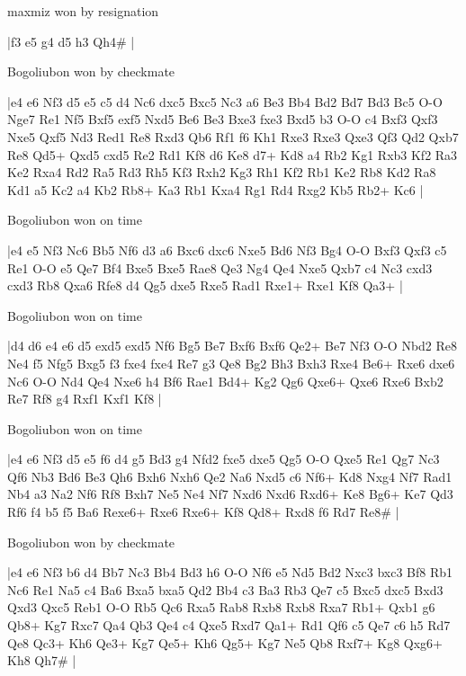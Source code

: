 \showboard

maxmiz won by resignation

\makegametitle
|f3 e5 g4 d5 h3 Qh4\#  |

\showboard

Bogoliubon won by checkmate

\makegametitle
|e4 e6 Nf3 d5 e5 c5 d4 Nc6 dxc5 Bxc5 Nc3 a6 Be3 Bb4 Bd2 Bd7 Bd3 Bc5 O-O Nge7 Re1 Nf5 Bxf5 exf5 Nxd5 Be6 Be3 Bxe3 fxe3 Bxd5 b3 O-O c4 Bxf3 Qxf3 Nxe5 Qxf5 Nd3 Red1 Re8 Rxd3 Qb6 Rf1 f6 Kh1 Rxe3 Rxe3 Qxe3 Qf3 Qd2 Qxb7 Re8 Qd5+ Qxd5 cxd5 Re2 Rd1 Kf8 d6 Ke8 d7+ Kd8 a4 Rb2 Kg1 Rxb3 Kf2 Ra3 Ke2 Rxa4 Rd2 Ra5 Rd3 Rh5 Kf3 Rxh2 Kg3 Rh1 Kf2 Rb1 Ke2 Rb8 Kd2 Ra8 Kd1 a5 Kc2 a4 Kb2 Rb8+ Ka3 Rb1 Kxa4 Rg1 Rd4 Rxg2 Kb5 Rb2+ Kc6  |

\showboard

Bogoliubon won on time

\makegametitle
|e4 e5 Nf3 Nc6 Bb5 Nf6 d3 a6 Bxc6 dxc6 Nxe5 Bd6 Nf3 Bg4 O-O Bxf3 Qxf3 c5 Re1 O-O e5 Qe7 Bf4 Bxe5 Bxe5 Rae8 Qe3 Ng4 Qe4 Nxe5 Qxb7 c4 Nc3 cxd3 cxd3 Rb8 Qxa6 Rfe8 d4 Qg5 dxe5 Rxe5 Rad1 Rxe1+ Rxe1 Kf8 Qa3+  |

\showboard

Bogoliubon won on time

\makegametitle
|d4 d6 e4 e6 d5 exd5 exd5 Nf6 Bg5 Be7 Bxf6 Bxf6 Qe2+ Be7 Nf3 O-O Nbd2 Re8 Ne4 f5 Nfg5 Bxg5 f3 fxe4 fxe4 Re7 g3 Qe8 Bg2 Bh3 Bxh3 Rxe4 Be6+ Rxe6 dxe6 Nc6 O-O Nd4 Qe4 Nxe6 h4 Bf6 Rae1 Bd4+ Kg2 Qg6 Qxe6+ Qxe6 Rxe6 Bxb2 Re7 Rf8 g4 Rxf1 Kxf1 Kf8  |

\showboard

Bogoliubon won on time

\makegametitle
|e4 e6 Nf3 d5 e5 f6 d4 g5 Bd3 g4 Nfd2 fxe5 dxe5 Qg5 O-O Qxe5 Re1 Qg7 Nc3 Qf6 Nb3 Bd6 Be3 Qh6 Bxh6 Nxh6 Qe2 Na6 Nxd5 c6 Nf6+ Kd8 Nxg4 Nf7 Rad1 Nb4 a3 Na2 Nf6 Rf8 Bxh7 Ne5 Ne4 Nf7 Nxd6 Nxd6 Rxd6+ Ke8 Bg6+ Ke7 Qd3 Rf6 f4 b5 f5 Ba6 Rexe6+ Rxe6 Rxe6+ Kf8 Qd8+ Rxd8 f6 Rd7 Re8\#  |

\showboard

Bogoliubon won by checkmate

\makegametitle
|e4 e6 Nf3 b6 d4 Bb7 Nc3 Bb4 Bd3 h6 O-O Nf6 e5 Nd5 Bd2 Nxc3 bxc3 Bf8 Rb1 Nc6 Re1 Na5 c4 Ba6 Bxa5 bxa5 Qd2 Bb4 c3 Ba3 Rb3 Qe7 c5 Bxc5 dxc5 Bxd3 Qxd3 Qxc5 Reb1 O-O Rb5 Qc6 Rxa5 Rab8 Rxb8 Rxb8 Rxa7 Rb1+ Qxb1 g6 Qb8+ Kg7 Rxc7 Qa4 Qb3 Qe4 c4 Qxe5 Rxd7 Qa1+ Rd1 Qf6 c5 Qe7 c6 h5 Rd7 Qe8 Qc3+ Kh6 Qe3+ Kg7 Qe5+ Kh6 Qg5+ Kg7 Ne5 Qb8 Rxf7+ Kg8 Qxg6+ Kh8 Qh7\#  |

